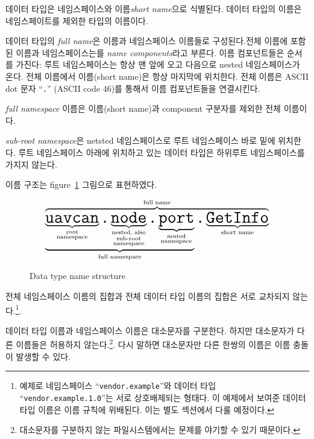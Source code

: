 데이터 타입은 네임스페이스와 이름\emph{short name}으로 식별된다.
데이터 타입의 이름은 네임스페이트를 제외한 타입의 이름이다.

데이터 타입의 \emph{full name}은 이름과 네임스페이스 이름들로 구성된다.전체 이름에 포함된 이름과 네임스페이스는를 \emph{name components}라고 부른다.
이름 컴포넌트들은 순서를 가진다: 루트 네임스페이스는 항상 맨 앞에 오고 다음으로 nested 네임스페이스가 온다.
전체 이름에서 이름(short name)은 항상 마지막에 위치한다.
전체 이름은 ASCII dot 문자 ``\verb|.|'' (ASCII code 46)를 통해서 이름 컴포넌트들을 연결시킨다.

\emph{full namespace} 이름은 이름(short name)과 component 구분자를 제외한 전체 이름이다.

\emph{sub-root namespace}은 netsted 네임스페이스로 루트 네임스페이스 바로 밑에 위치한다.
루트 네임스페이스 아래에 위치하고 있는 데이터 타입은 하위루트 네임스페이스를 가지지 않는다.

이름 구조는 figure~\ref{fig:dsdl_data_type_name_structure} 그림으로 표현하였다.

\begin{figure}[H]
    $$
    \overbrace{
        \underbrace{
            \underbrace{\texttt{\huge{uavcan}}}_{\substack{\text{root} \\ \text{namespace}}}%
            \texttt{\huge{.}}%
            \underbrace{\texttt{\huge{node}}}_{\substack{\text{nested, also} \\ \text{sub-root} \\ \text{namespace}}}%
            \texttt{\huge{.}}%
            \underbrace{\texttt{\huge{port}}}_{\substack{\text{nested} \\ \text{namespace}}}%
        }_{\text{full namespace}}%
        \texttt{\huge{.}}%
        \underbrace{\texttt{\huge{GetInfo}}}_{\text{short name}}
    }^{\text{full name}}
    $$
    \caption{Data type name structure\label{fig:dsdl_data_type_name_structure}}
\end{figure}

전체 네임스페이스 이름의 집합과 전체 데이터 타입 이름의 집합은 서로 교차되지 않는다.\footnote{%
    예제로 네임스페이스 ``\texttt{vendor.example}''와 데이터 타입 ``\texttt{vendor.example.1.0}''는 서로 상호배제되는 형태다.
    이 예제에서 보여준 데이터 타입 이름은 이름 규칙에 위배된다. 이는 별도 섹션에서 다룰 예정이다.
}.

데이터 타입 이름과 네임스페이스 이름은 대소문자를 구분한다.
하지만 대소문자가 다른 이름들은 허용하지 않는다.\footnote{%
    대소문자를 구분하지 않는 파일시스템에서는 문제를 야기할 수 있기 때문이다.
}.
다시 말하면 대소문자만 다른 한쌍의 이름은 이름 충돌이 발생할 수 있다.

